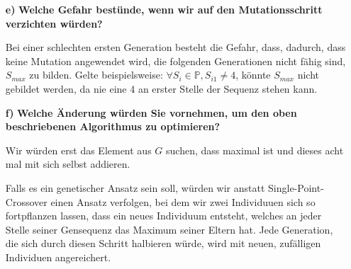 \documentclass[12pt, twoside]{article}
\begin{document}
\begin{enumerate}[label={\textbf{\alph*)}}]
  \item[\textbf{e)}] \textbf{Welche Gefahr best\"unde, wenn
          wir auf den Mutationsschritt verzichten
          w\"urden?}

        Bei einer schlechten ersten Generation besteht die
        Gefahr, dass, dadurch, dass keine Mutation
        angewendet wird, die folgenden Generationen nicht
        f\"ahig sind, $S_{max}$ zu bilden. Gelte
        beispielsweise: $\forall S_i \in \mathbb{P}, S_{i1}
        \neq 4$, k\"onnte $S_{max}$ nicht gebildet werden,
        da nie eine 4 an erster Stelle der Sequenz stehen
        kann.

  \item[\textbf{f)}] \textbf{Welche \"Anderung w\"urden Sie
          vornehmen, um den oben beschriebenen Algorithmus
          zu optimieren?}

        Wir w\"urden erst das Element aus $G$ suchen, dass
        maximal ist und dieses acht mal mit sich selbst
        addieren.

        Falls es ein genetischer Ansatz sein soll, w\"urden
        wir anstatt Single-Point-Crossover einen Ansatz
        verfolgen, bei dem wir zwei Individuuen sich so
        fortpflanzen lassen, dass ein neues Individuum
        entsteht, welches an jeder Stelle seiner Gensequenz
        das Maximum seiner Eltern hat. Jede Generation, die
        sich durch diesen Schritt halbieren w\"urde, wird
        mit neuen, zuf\"alligen Individuen
        angereichert.

\end{enumerate}
\end{document}
